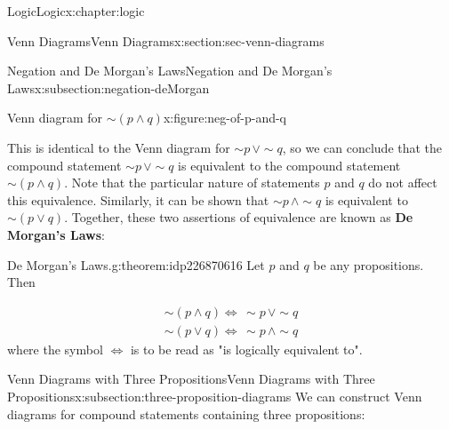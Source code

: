 \documentclass[twoside,10pt,]{book}
\newcommand{\terminology}[1]{\textbf{#1}}
\numberwithin{equation}{section}
\begin{document}
\begin{chapterptx}{Logic}{}{Logic}{}{}{x:chapter:logic}
\begin{sectionptx}{Venn Diagrams}{}{Venn Diagrams}{}{}{x:section:sec-venn-diagrams}
\begin{subsectionptx}{Negation and De Morgan's Laws}{}{Negation and De Morgan's Laws}{}{}{x:subsection:negation-deMorgan}
\par
\begin{figureptx}{Venn diagram for \(\sim\!(p {\wedge} q)\)}{x:figure:neg-of-p-and-q}{}%
\begin{image}{0.3}{0.4}{0.3}%
\resizebox{\linewidth}{!}{%
\begin{venndiagram2sets}[labelA={$p$},labelB={$q$}]
  \fillNotAorNotB
\end{venndiagram2sets}
}%
\end{image}%
\tcblower
\end{figureptx}%
%
\par
This is identical to the Venn diagram for \(\sim\!{p}\,{\vee} \sim\!{q}\), so we can conclude that the compound statement \(\sim\!{p}\,{\vee} \sim\!{q}\) is equivalent to the compound statement \(\sim\!(p {\wedge} q)\).  Note that the particular nature of statements \(p\) and \(q\) do not affect this equivalence.  Similarly, it can be shown that \(\sim\!{p}\,{\wedge}\sim\!{q}\) is equivalent to \(\sim\!(p{\vee} q)\).  Together, these two assertions of equivalence are known as \terminology{De Morgan's Laws}: \begin{theorem}{De Morgan's Laws.}{}{g:theorem:idp226870616}%
Let \(p\) and \(q\) be any propositions.  Then%
\par
%
\begin{gather*}
\sim\!(p{\wedge} q)\Leftrightarrow\,\sim\!{p}\,{\vee}\sim\!{q}\\
\sim\!(p{\vee} q)\Leftrightarrow\,\sim\!{p}\,{\wedge}\sim\!{q}
\end{gather*}
where the symbol \(\Leftrightarrow\) is to be read as "is logically equivalent to".%
\end{theorem}
%
\end{subsectionptx}
%
%
\typeout{************************************************}
\typeout{************************************************}
%
\begin{subsectionptx}{Venn Diagrams with Three Propositions}{}{Venn Diagrams with Three Propositions}{}{}{x:subsection:three-proposition-diagrams}
We can construct Venn diagrams for compound statements containing three propositions:%
\par
\begin{image}{0.3}{0.4}{0.3}%
\resizebox{\linewidth}{!}{%
\begin{venndiagram3sets}[labelA={$p$},labelB={$q$},labelC={$r$}]
\end{venndiagram3sets}
}%
\end{image}%

\end{subsectionptx}
\end{sectionptx}
\end{chapterptx}
\end{document}
